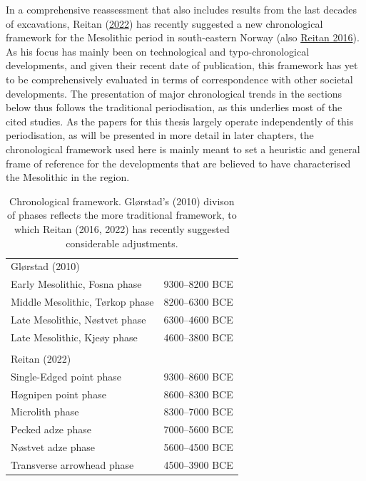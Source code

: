 \documentclass[
  12pt,
  a4paper,
  oneside]{book}
\begin{document}
In a comprehensive reassessment that also includes results from the last decades of excavations, Reitan (\protect\hyperlink{ref-reitan2022}{2022}) has recently suggested a new chronological framework for the Mesolithic period in south-eastern Norway (also \protect\hyperlink{ref-reitan2016}{Reitan 2016}). As his focus has mainly been on technological and typo-chronological developments, and given their recent date of publication, this framework has yet to be comprehensively evaluated in terms of correspondence with other societal developments. The presentation of major chronological trends in the sections below thus follows the traditional periodisation, as this underlies most of the cited studies. As the papers for this thesis largely operate independently of this periodisation, as will be presented in more detail in later chapters, the chronological framework used here is mainly meant to set a heuristic and general frame of reference for the developments that are believed to have characterised the Mesolithic in the region.

\begin{table}

\caption{\label{tab:tab1}Chronological framework. Glørstad's (2010) divison of phases reflects the more traditional framework, to which Reitan (2016, 2022) has recently suggested considerable adjustments.}
\centering
\begin{tabular}[t]{ll}
\toprule
Glørstad (2010) & \\
Early Mesolithic, Fosna phase & 9300–8200 BCE\\
Middle Mesolithic, Tørkop phase & 8200–6300 BCE\\
Late Mesolithic, Nøstvet phase & 6300–4600 BCE\\
Late Mesolithic, Kjeøy phase & 4600–3800 BCE\\
 & \\
Reitan (2022) & \\
Single-Edged point phase & 9300–8600 BCE\\
Høgnipen point phase & 8600–8300 BCE\\
Microlith phase & 8300–7000 BCE\\
Pecked adze phase & 7000–5600 BCE\\
Nøstvet adze phase & 5600–4500 BCE\\
Transverse arrowhead phase & 4500–3900 BCE\\
\bottomrule
\end{tabular}
\end{table}
\end{document}
